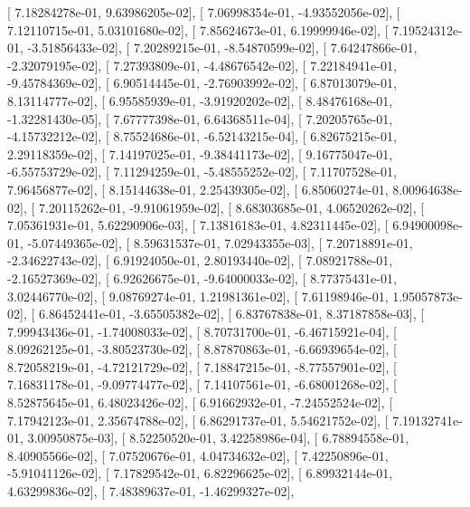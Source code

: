 \documentclass{article}
\begin{document}
       [  7.18284278e-01,   9.63986205e-02],
       [  7.06998354e-01,  -4.93552056e-02],
       [  7.12110715e-01,   5.03101680e-02],
       [  7.85624673e-01,   6.19999946e-02],
       [  7.19524312e-01,  -3.51856433e-02],
       [  7.20289215e-01,  -8.54870599e-02],
       [  7.64247866e-01,  -2.32079195e-02],
       [  7.27393809e-01,  -4.48676542e-02],
       [  7.22184941e-01,  -9.45784369e-02],
       [  6.90514445e-01,  -2.76903992e-02],
       [  6.87013079e-01,   8.13114777e-02],
       [  6.95585939e-01,  -3.91920202e-02],
       [  8.48476168e-01,  -1.32281430e-05],
       [  7.67777398e-01,   6.64368511e-04],
       [  7.20205765e-01,  -4.15732212e-02],
       [  8.75524686e-01,  -6.52143215e-04],
       [  6.82675215e-01,   2.29118359e-02],
       [  7.14197025e-01,  -9.38441173e-02],
       [  9.16775047e-01,  -6.55753729e-02],
       [  7.11294259e-01,  -5.48555252e-02],
       [  7.11707528e-01,   7.96456877e-02],
       [  8.15144638e-01,   2.25439305e-02],
       [  6.85060274e-01,   8.00964638e-02],
       [  7.20115262e-01,  -9.91061959e-02],
       [  8.68303685e-01,   4.06520262e-02],
       [  7.05361931e-01,   5.62290906e-03],
       [  7.13816183e-01,   4.82311445e-02],
       [  6.94900098e-01,  -5.07449365e-02],
       [  8.59631537e-01,   7.02943355e-03],
       [  7.20718891e-01,  -2.34622743e-02],
       [  6.91924050e-01,   2.80193440e-02],
       [  7.08921788e-01,  -2.16527369e-02],
       [  6.92626675e-01,  -9.64000033e-02],
       [  8.77375431e-01,   3.02446770e-02],
       [  9.08769274e-01,   1.21981361e-02],
       [  7.61198946e-01,   1.95057873e-02],
       [  6.86452441e-01,  -3.65505382e-02],
       [  6.83767838e-01,   8.37187858e-03],
       [  7.99943436e-01,  -1.74008033e-02],
       [  8.70731700e-01,  -6.46715921e-04],
       [  8.09262125e-01,  -3.80523730e-02],
       [  8.87870863e-01,  -6.66939654e-02],
       [  8.72058219e-01,  -4.72121729e-02],
       [  7.18847215e-01,  -8.77557901e-02],
       [  7.16831178e-01,  -9.09774477e-02],
       [  7.14107561e-01,  -6.68001268e-02],
       [  8.52875645e-01,   6.48023426e-02],
       [  6.91662932e-01,  -7.24552524e-02],
       [  7.17942123e-01,   2.35674788e-02],
       [  6.86291737e-01,   5.54621752e-02],
       [  7.19132741e-01,   3.00950875e-03],
       [  8.52250520e-01,   3.42258986e-04],
       [  6.78894558e-01,   8.40905566e-02],
       [  7.07520676e-01,   4.04734632e-02],
       [  7.42250896e-01,  -5.91041126e-02],
       [  7.17829542e-01,   6.82296625e-02],
       [  6.89932144e-01,   4.63299836e-02],
       [  7.48389637e-01,  -1.46299327e-02],
\end{document}
